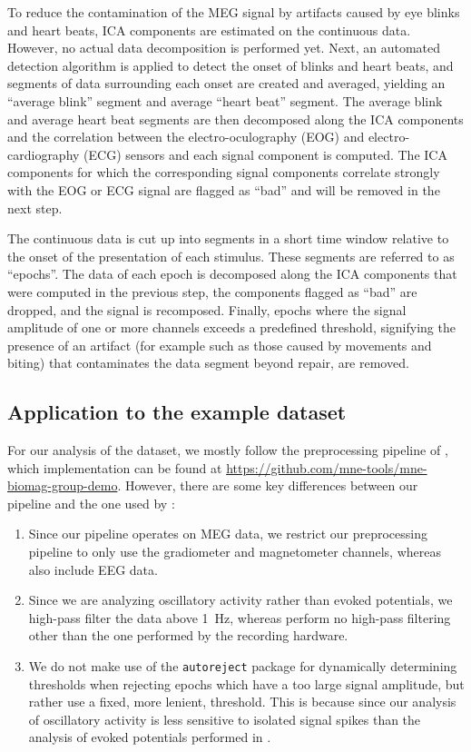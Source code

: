 \documentclass[utf8]{frontiersSCNS}
\newcommand{\textcite}[1]{\citet{#1}}
\newcommand{\code}[1]{\lstinline{#1}}
\begin{document}
To reduce the contamination of the MEG signal by artifacts caused by eye blinks and heart beats, ICA components are estimated on the continuous data.
However, no actual data decomposition is performed yet.
Next, an automated detection algorithm is applied to detect the onset of blinks and heart beats, and segments of data surrounding each onset are created and averaged, yielding an
``average blink'' segment and average ``heart beat'' segment.
The average blink and average heart beat segments are then decomposed along the ICA components and the correlation between the electro-oculography (EOG) and electro-cardiography (ECG) sensors and each signal component is computed.
The ICA components for which the corresponding signal components correlate strongly with the EOG or ECG signal are flagged as ``bad'' and will be removed in the next step.

The continuous data is cut up into segments in a short time window relative to the onset of the presentation of each stimulus.
These segments are referred to as ``epochs''.
The data of each epoch is decomposed along the ICA components that were computed in the previous step, the components flagged as ``bad'' are dropped, and the signal is recomposed.
Finally, epochs where the signal amplitude of one or more channels exceeds a predefined threshold, signifying the presence of an artifact (for example such as those caused by movements and biting) that contaminates the data segment beyond repair, are removed.


\subsection{Application to the example dataset}

For our analysis of the \textcite{Wakeman2015} dataset, we mostly follow the preprocessing pipeline of \textcite{Jas2017}, which implementation can be found at \url{https://github.com/mne-tools/mne-biomag-group-demo}.
However, there are some key differences between our pipeline and the one used by \textcite{Jas2017}:
\begin{enumerate}
    \item Since our pipeline operates on MEG data, we restrict our preprocessing pipeline to only use the gradiometer and magnetometer channels, whereas \textcite{Jas2017} also include EEG data.
    \item Since we are analyzing oscillatory activity rather than evoked potentials, we high-pass filter the data above \SI{1}{\hertz}, whereas \textcite{Jas2017} perform no high-pass filtering other than the one performed by the recording hardware.
    \item We do not make use of the \code{autoreject} package for dynamically determining thresholds when rejecting epochs which have a too large signal amplitude, but rather use a fixed, more lenient, threshold. This is because since our analysis of oscillatory activity is less sensitive to isolated signal spikes than the analysis of evoked potentials performed in \textcite{Jas2017}.
\end{enumerate}
\end{document}

